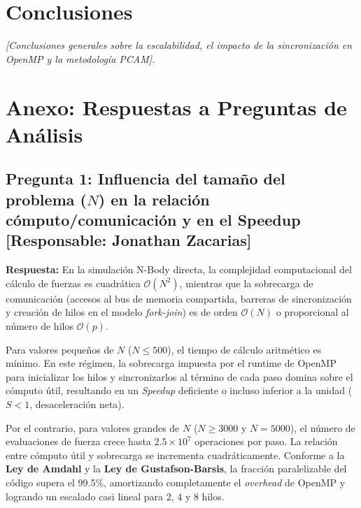 \documentclass[11pt,a4paper]{article}
\begin{document}
\section{Conclusiones}
\textit{[Conclusiones generales sobre la escalabilidad, el impacto de la sincronización en OpenMP y la metodología PCAM].}

\newpage
\appendix
\section{Anexo: Respuestas a Preguntas de Análisis}

\subsection*{Pregunta 1: Influencia del tamaño del problema ($N$) en la relación cómputo/comunicación y en el Speedup [Responsable: Jonathan Zacarias]}

\textbf{Respuesta:}  
En la simulación N-Body directa, la complejidad computacional del cálculo de fuerzas es cuadrática $\mathcal{O}(N^2)$, mientras que la sobrecarga de comunicación (accesos al bus de memoria compartida, barreras de sincronización y creación de hilos en el modelo \textit{fork-join}) es de orden $\mathcal{O}(N)$ o proporcional al número de hilos $\mathcal{O}(p)$.

Para valores pequeños de $N$ ($N \le 500$), el tiempo de cálculo aritmético es mínimo. En este régimen, la sobrecarga impuesta por el runtime de OpenMP para inicializar los hilos y sincronizarlos al término de cada paso domina sobre el cómputo útil, resultando en un \textit{Speedup} deficiente o incluso inferior a la unidad ($S < 1$, desaceleración neta).

Por el contrario, para valores grandes de $N$ ($N \ge 3000$ y $N = 5000$), el número de evaluaciones de fuerza crece hasta $2.5 \times 10^7$ operaciones por paso. La relación entre cómputo útil y sobrecarga se incrementa cuadráticamente. Conforme a la \textbf{Ley de Amdahl} y la \textbf{Ley de Gustafson-Barsis}, la fracción paralelizable del código supera el 99.5\%, amortizando completamente el \textit{overhead} de OpenMP y logrando un escalado casi lineal para 2, 4 y 8 hilos.
\end{document}
